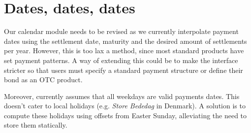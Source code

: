 \section{Dates, dates, dates}

Our calendar module needs to be revised as we currently interpolate 
payment dates using the settlement date, maturity and the desired amount of 
settlements per year. However, this is too lax a method, since most standard 
products have set payment patterns. A way of extending this could be to make
the interface stricter so that users must specify a standard payment 
structure or define their bond as an OTC product.

Moreover, \hql currently assumes that all weekdays are valid payments dates. 
This doesn't cater to local holidays (e.g. \emph{Store Bededag} in Denmark). A 
solution is to compute these holidays using offsets from Easter Sunday, 
alleviating the need to store them statically.\\

